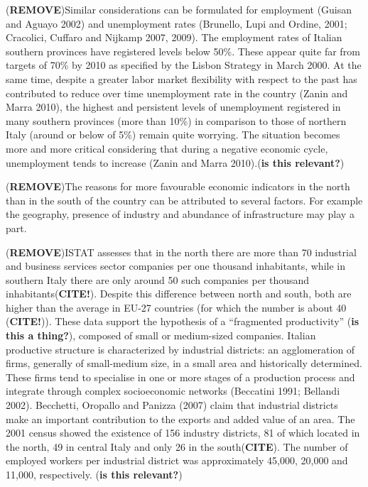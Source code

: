 \documentclass[10pt]{article}
\theoremstyle{definition}
\theoremstyle{plain}
\begin{document}
(\textbf{REMOVE})Similar considerations can be formulated for employment (Guisan and Aguayo 2002) and unemployment rates (Brunello, Lupi and Ordine, 2001; Cracolici, Cuffaro and Nijkamp 2007, 2009). The employment rates of Italian southern provinces have registered levels below 50\%. These appear quite far from targets of 70\% by 2010 as specified by the Lisbon Strategy in March 2000. At the same time, despite a greater labor market flexibility with respect to the past has contributed to reduce over time unemployment rate in the country (Zanin and Marra 2010), the highest and persistent levels of unemployment registered in many southern provinces (more than 10\%) in comparison to those of northern Italy (around or below of 5\%) remain quite worrying. The situation becomes more and more critical considering that during a negative economic cycle, unemployment tends to increase (Zanin and Marra 2010).(\textbf{is this relevant?})

(\textbf{REMOVE})The reasons for more favourable economic indicators in the north than in the south of the country can be attributed to several factors. For example the geography, presence of industry and abundance of infrastructure may play a part.

(\textbf{REMOVE})ISTAT assesses that in the north there are more than 70 industrial and business services sector companies per one thousand inhabitants, while in southern Italy there are only around 50 such companies per thousand inhabitants(\textbf{CITE!}). Despite this difference between north and south, both are higher than the average in EU-27 countries (for which the number is about 40 (\textbf{CITE!})). These data support the hypothesis of a ``fragmented productivity'' (\textbf{is this a thing?}), composed of small or medium-sized companies. Italian productive structure is characterized by industrial districts: an agglomeration of firms, generally of small-medium size, in a small area and historically determined. These firms tend to specialise in one or more stages of a production process and integrate through complex socioeconomic networks (Beccatini 1991; Bellandi 2002). Becchetti, Oropallo and Panizza (2007) claim that industrial districts make an important contribution to the exports and added value of an area. The 2001 census showed the existence of 156 industry districts, 81 of which located in the north, 49 in central Italy and only 26 in the south(\textbf{CITE}). The number of employed workers per industrial district was approximately 45,000, 20,000 and 11,000, respectively.  (\textbf{is this relevant?})
\end{document}
